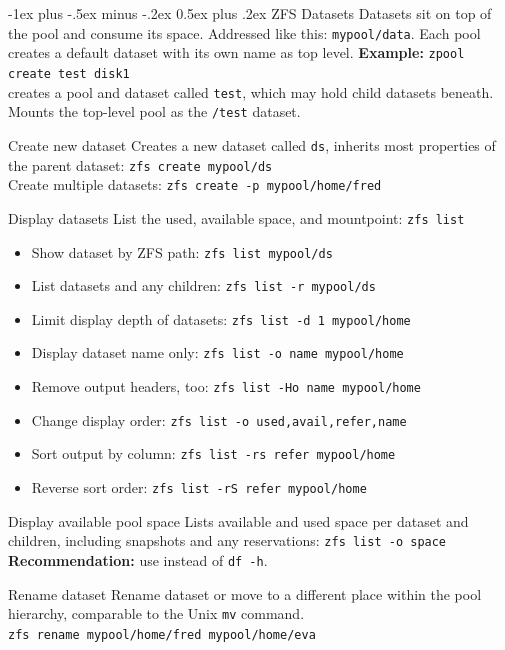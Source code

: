 \documentclass[10pt,landscape,letter]{article}
\makeatletter
\renewcommand{\section}{\@startsection{section}{1}{0mm}%
                                {-1ex plus -.5ex minus -.2ex}%
                                {0.5ex plus .2ex}%
                                {\normalfont\large\bfseries}}
\makeatother
\begin{document}
\begin{multicols}{3}
	\section{ZFS Datasets}
  Datasets sit on top of the pool and consume its space. Addressed like this:
  \texttt{mypool/data}. Each pool creates a default dataset with its own
  name as top level.
  \textbf{Example:} \texttt{zpool create test disk1}\\ creates a pool and
  dataset called \texttt{test}, which may hold child datasets beneath. Mounts
  the top-level pool as the \texttt{/test} dataset.
	\begin{Description}
    \item[Create new dataset] Creates a new dataset called \texttt{ds},
      inherits most properties of the parent dataset: \texttt{zfs create
      mypool/ds}\\ Create multiple datasets: \texttt{zfs create -p mypool/home/fred}
      \item [Display datasets] List the used, available space, and mountpoint: \texttt{zfs list}
        \begin{itemize}
          \item Show dataset by ZFS path: \texttt{zfs list mypool/ds}
          \item List datasets and any children:
            \texttt{zfs list -r mypool/ds}
          \item Limit display depth of datasets:
            \texttt{zfs list -d 1 mypool/home}
          \item Display dataset name only:
            \texttt{zfs list -o name mypool/home}
          \item Remove output headers, too:
            \texttt{zfs list -Ho name mypool/home}
          \item Change display order:
            \texttt{zfs list -o used,avail,refer,name}
          \item Sort output by column:
            \texttt{zfs list -rs refer mypool/home}
          \item Reverse sort order:
            \texttt{zfs list -rS refer mypool/home}
        \end{itemize}
    \item[Display available pool space] Lists available and used space per
      dataset and children, including snapshots and any reservations:
      \texttt{zfs list -o space} \textbf{Recommendation:} use instead of
      \texttt{df -h}.
    \item[Rename dataset] Rename dataset or move to a different place within
      the pool hierarchy, comparable to the Unix \texttt{mv} command.\\
      \texttt{zfs rename mypool/home/fred mypool/home/eva}


\end{Description}
\end{multicols}
\end{document}
